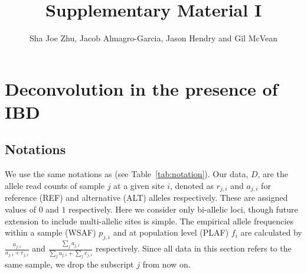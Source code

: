 \documentclass[9pt,lineno]{elife}
\title{Supplementary Material I}
\author{Sha Joe Zhu, Jacob Almagro-Garcia, Jason Hendry and Gil McVean}
\date{}
\begin{document}
\maketitle{}

\tableofcontents


\newpage




\section{Deconvolution in the presence of IBD}





\subsection{Notations}
We use the same notations as \citet{Zhu2017} (see Table~\ref{tab:notation}). Our data, $D$, are the allele read counts of sample $j$ at a given site $i$, denoted as $r_{j,i}$ and $a_{j,i}$ for reference (REF) and alternative (ALT) alleles respectively.  These are assigned values of $0$ and $1$ respectively. Here we consider only bi-allelic loci, though future extension to include multi-allelic sites is simple.  The empirical allele frequencies within a sample (WSAF) $p_{j,i}$ and at population level (PLAF) $f_i$ are calculated by $ \frac{a_{j,i}}{a_{j,i} + r_{j,i}}$ and $ \frac{\sum_j a_{j,i}}{\sum_j a_{j,i} + \sum_j r_{j,i}}$ respectively. Since all data in this section refers to the same sample, we drop the subscript $j$ from now on.
\end{document}
